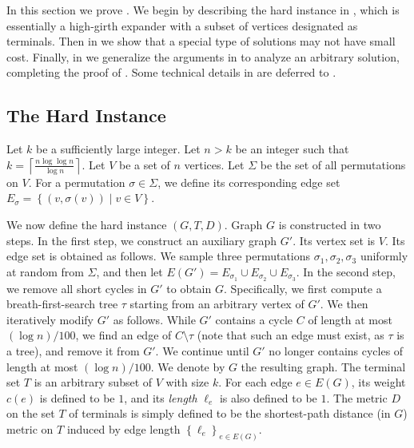 \documentclass[11pt]{article}
\theoremstyle{definition}
\newcommand{\set}[1]{\left\{ #1 \right\}}
\def\ceil#1{\left\lceil #1 \right\rceil}
\newcounter{note}
\begin{document}
In this section we prove . We begin by describing the hard instance in , which is essentially a high-girth expander with a subset of vertices designated as terminals. Then in  we show that a special type of solutions may not have small cost. Finally, in  we generalize the arguments in  to analyze an arbitrary solution, completing the proof of . Some technical details in  are deferred to .



\subsection{The Hard Instance}
\label{subsec: instance}

Let $k$ be a sufficiently large integer.
Let $n>k$ be an integer such that $k=\ceil{\frac{n\log \log n}{\log n}}$.
Let $V$ be a set of $n$ vertices.
Let $\Sigma$ be the set of all permutations on $V$. For a permutation $\sigma\in \Sigma$, we define its corresponding edge set $E_{\sigma}=\set{(v,\sigma(v))\mid v\in V}$.

We now define the hard instance $(G,T,D)$. 
Graph $G$ is constructed in two steps. In the first step, we construct an auxiliary graph $G'$.
Its vertex set is $V$. Its edge set is obtained as follows. We sample three permutations $\sigma_1,\sigma_2,\sigma_3$ uniformly at random from $\Sigma$, and then let $E(G')=E_{\sigma_1}\cup E_{\sigma_2}\cup E_{\sigma_3}$.
In the second step, we remove all short cycles in $G'$ to obtain $G$.
%
Specifically, we first compute a breath-first-search tree $\tau$ starting from an arbitrary vertex of $G'$.
We then iteratively modify $G'$ as follows.
While $G'$ contains a cycle $C$ of length at most $(\log n)/100$, we find an edge of $C\setminus \tau$ (note that such an edge must exist, as $\tau$ is a tree), and remove it from $G'$. We continue until $G'$ no longer contains cycles of length at most $(\log n)/100$. We denote by $G$ the resulting graph.
%
The terminal set $T$ is an arbitrary subset of $V$ with size $k$. For each edge $e\in E(G)$, its weight $c(e)$ is defined to be $1$, and its \emph{length} $\ell_e$ is also defined to be $1$. The metric $D$ on the set $T$ of terminals is simply defined to be the shortest-path distance (in $G$) metric on $T$ induced by edge length $\set{\ell_e}_{e\in E(G)}$.
\end{document}
